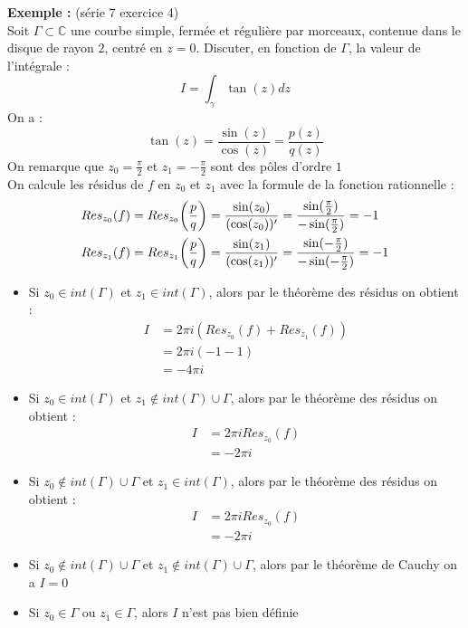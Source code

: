 \textbf{Exemple :} (série 7 exercice 4) \\
Soit $\Gamma \subset \mathbb{C}$ une courbe simple, fermée et régulière par morceaux, contenue dans le disque de rayon $2$, centré en $z=0$. Discuter, en fonction de $\Gamma$, la valeur de l'intégrale :
$$I = \int_{\gamma} \tan(z)dz$$
On a :
$$\tan(z) = \frac{\sin(z)}{\cos(z)} = \frac{p(z)}{q(z)}$$
On remarque que $z_0 = \frac{\pi}{2}$ et $z_1 = -\frac{\pi}{2}$ sont des pôles d'ordre $1$ \\
On calcule les résidus de $f$ en $z_0$ et $z_1$ avec la formule de la fonction rationnelle  :
\begin{align*}
    Res_{z_0}(f) &= Res_{z_0}\bigg{(}\frac{p}{q}\bigg{)} = \frac{\sin(z_0)}{(\cos(z_0))'} = \frac{\sin(\frac{\pi}{2})}{-\sin(\frac{\pi}{2})} = -1 \\
    Res_{z_1}(f) &= Res_{z_1}\bigg{(}\frac{p}{q}\bigg{)} = \frac{\sin(z_1)}{(\cos(z_1))'} = \frac{\sin(-\frac{\pi}{2})}{-\sin(-\frac{\pi}{2})} = -1
\end{align*}
\begin{itemize}
    \item Si $z_0 \in int(\Gamma)$ et $z_1 \in int(\Gamma)$, alors par le théorème des résidus on obtient :
    \begin{align*}
        I &= 2\pi i (Res_{z_0}(f) + Res_{z_1}(f)) \\
        &= 2\pi i (-1-1) \\
        &= -4\pi i
    \end{align*}
    \item Si $z_0 \in int(\Gamma)$ et $z_1 \notin int(\Gamma) \cup \Gamma$, alors par le théorème des résidus on obtient :
    \begin{align*}
        I &= 2\pi i Res_{z_0}(f) \\
        &= -2\pi i
    \end{align*}
    \item Si $z_0 \notin int(\Gamma) \cup \Gamma$ et $z_1 \in int(\Gamma)$, alors par le théorème des résidus on obtient :
    \begin{align*}
        I &= 2\pi i Res_{z_0}(f) \\
        &= -2\pi i
    \end{align*}
    \item Si $z_0 \notin int(\Gamma) \cup \Gamma$ et $z_1 \notin int(\Gamma) \cup \Gamma$, alors par le théorème de Cauchy on a $I = 0$
    \item Si $z_0 \in \Gamma$ ou $z_1 \in \Gamma$, alors $I$ n'est pas bien définie
\end{itemize}